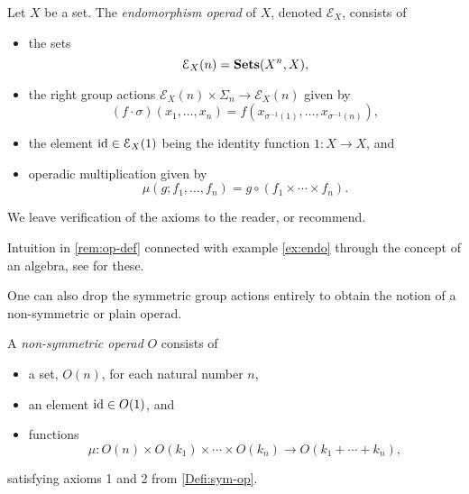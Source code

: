\begin{example}\label{ex:endo}
Let $X$ be a set. The \emph{endomorphism operad} of $X$, denoted $\mathcal{E}_X$, consists of 
\begin{itemize}
\item the sets
\[
\mathcal{E}_X(n) = \mathbf{Sets}(X^n, X),
\]
\item the right group actions $\mathcal{E}_X(n) \times \Sigma_n \to \mathcal{E}_X(n)$ given by
\[
(f \cdot \sigma)(x_1, \ldots, x_n) = f( x_{\sigma^{-1}(1)}, \ldots, x_{\sigma^{-1}(n)}),
\]
\item the element $\textrm{id} \in \mathcal{E}_X(1)$ being the identity function $1 \colon X \to X$, and
\item operadic multiplication given by
\[
\mu(g; f_1, \ldots, f_n) = g \circ (f_1 \times \cdots \times f_n).
\]
\end{itemize}
We leave verification of the axioms to the reader, or recommend.
\end{example}

\begin{rem}
Intuition in \cref{rem:op-def} connected with example \cref{ex:endo} through the concept of an algebra, see for these.
\end{rem}

One can also drop the symmetric group actions entirely to obtain the notion of a non-symmetric or plain operad.

\begin{Defi}\label{Defi:non-sym-op}
A \emph{non-symmetric operad} $O$ consists of 
\begin{itemize}
\item a set, $O(n)$, for each natural number $n$,
\item an element $\textrm{id} \in O(1)$, and
\item functions
  \[
    \mu \colon  O(n) \times O(k_{1}) \times \cdots \times O(k_{n}) \rightarrow O(k_{1} + \cdots + k_{n}),
  \]
\end{itemize}
satisfying axioms 1 and 2 from \cref{Defi:sym-op}.
\end{Defi}


